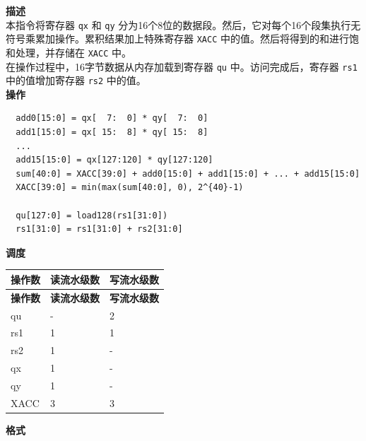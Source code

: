 \textbf{描述}\\
本指令将寄存器 \lstinline{qx} 和 \lstinline{qy} 分为16个8位的数据段。然后，它对每个16个段集执行无符号乘累加操作。累积结果加上特殊寄存器 \lstinline{XACC} 中的值。然后将得到的和进行饱和处理，并存储在 \lstinline{XACC} 中。\\
在操作过程中，16字节数据从内存加载到寄存器 \lstinline{qu} 中。访问完成后，寄存器 \lstinline{rs1} 中的值增加寄存器 \lstinline{rs2} 中的值。\\
\textbf{操作}
\begin{lstlisting}
  add0[15:0] = qx[  7:  0] * qy[  7:  0]
  add1[15:0] = qx[ 15:  8] * qy[ 15:  8]
  ...
  add15[15:0] = qx[127:120] * qy[127:120]
  sum[40:0] = XACC[39:0] + add0[15:0] + add1[15:0] + ... + add15[15:0]
  XACC[39:0] = min(max(sum[40:0], 0), 2^{40}-1)

  qu[127:0] = load128(rs1[31:0])
  rs1[31:0] = rs1[31:0] + rs2[31:0]
\end{lstlisting}

\textbf{调度}\\
\begin{longtable}[c]{|l|l|l|}
    \hline
    \rowcolor{lightgray}
    \textbf{操作数} & \textbf{读流水级数} & \textbf{写流水级数} \\\hline
    \endfirsthead
    \hline
    \rowcolor{lightgray}
     \textbf{操作数} & \textbf{读流水级数} & \textbf{写流水级数} \\\hline
    \endhead
    \hline
    \endfoot

    qu & - & 2 \\\hline
    rs1 & 1 & 1 \\\hline
    rs2 & 1 & - \\\hline
     qx & 1 & - \\\hline
     qy & 1 & - \\\hline
     XACC & 3 & 3

\end{longtable}

\textbf{格式}\\


